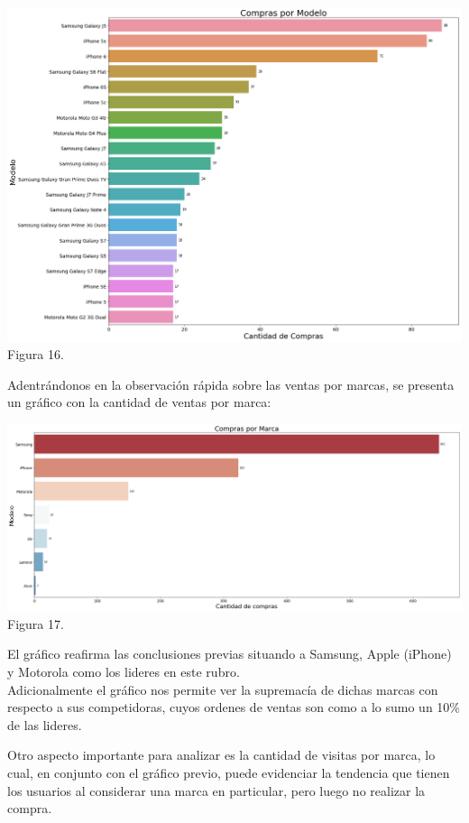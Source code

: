 \documentclass[a4paper ,12pt]{article}
\begin{document}
\begin{center}
	\includegraphics[width=1.1\linewidth]{output_61_0}
	Figura 16.
	
\end{center}
\newpage
Adentrándonos en la observación rápida sobre las ventas por marcas, se presenta un gráfico con la cantidad de ventas por marca: \\

\begin{center}
	\includegraphics[width=1.1\linewidth]{output_63_0}
	Figura 17.
	
\end{center}

El gráfico reafirma las conclusiones previas situando a Samsung, Apple (iPhone) y Motorola como los lideres en este rubro. \\

Adicionalmente el gráfico nos permite ver la supremacía de dichas marcas con respecto a sus competidoras, cuyos ordenes de ventas son como a lo sumo un 10\% de las lideres.


Otro aspecto importante para analizar es la cantidad de visitas por marca, lo cual, en conjunto con el gráfico previo, puede evidenciar la tendencia que tienen los usuarios al considerar una marca en particular, pero luego no realizar la compra.\\
\end{document}
